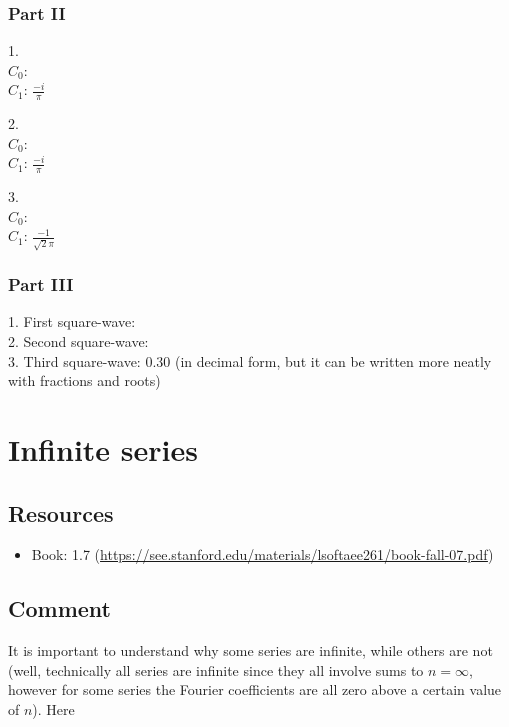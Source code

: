 \subsubsection*{Part II}
1.\\
$C_0$: \\
$C_1$: $\displaystyle \frac{-i}{\pi}$

2.\\
$C_0$: \\
$C_1$: $\displaystyle \frac{-i}{\pi}$

3.\\
$C_0$: \\
$C_1$: $\displaystyle \frac{-1}{\sqrt{2}\pi}$

\subsubsection*{Part III}
1. First square-wave: \\
2. Second square-wave: \\
3. Third square-wave: 0.30 (in decimal form, but it can be written more neatly with fractions and roots)

\timebox




\newpage
\section{Infinite series}

\subsection*{Resources}
\begin{itemize}
    \item Book: 1.7 (\url{https://see.stanford.edu/materials/lsoftaee261/book-fall-07.pdf})
\end{itemize}

\subsection*{Comment}
It is important to understand why some series are infinite, while others are not (well, technically all series are infinite since they all involve sums to $n=\infty$, however for some series the Fourier coefficients are all zero above a certain value of $n$). Here

